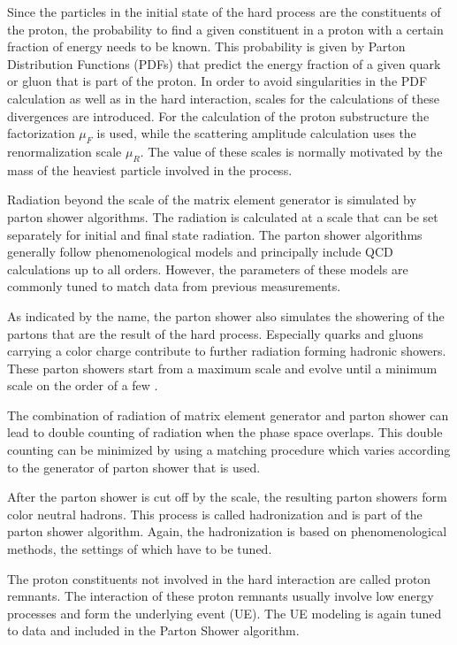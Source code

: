 Since the particles in the initial state of the hard process are the constituents of the proton, the probability to find a given constituent in a proton with a certain fraction of energy needs to be known.
This probability is given by Parton Distribution Functions (PDFs) that predict the energy fraction of a given quark or gluon that is part of the proton.
In order to avoid singularities in the PDF calculation as well as in the hard interaction, scales for the calculations of these divergences are introduced.
For the calculation of the proton substructure the factorization $\mu_F$ is used, while the scattering amplitude calculation uses the renormalization scale $\mu_R$.
The value of these scales is normally motivated by the mass of the heaviest particle involved in the process.

Radiation beyond the scale of the matrix element generator is simulated by parton shower algorithms.
The radiation is calculated at a scale that can be set separately for initial and final state radiation. 
The parton shower algorithms generally follow phenomenological models and principally include QCD calculations up to all orders.
However, the parameters of these models are commonly tuned to match data from previous measurements.

As indicated by the name, the parton shower also simulates the showering of the partons that are the result of the hard process.
Especially quarks and gluons carrying a color charge contribute to further radiation forming hadronic showers.
These parton showers start from a maximum scale and evolve until a minimum scale on the order of a few \GeV. 

The combination of radiation of matrix element generator and parton shower can lead to double counting of radiation when the phase space overlaps.
This double counting can be minimized by using a matching procedure which varies according to the generator of parton shower that is used.

After the parton shower is cut off by the scale, the resulting parton showers form color neutral hadrons.
This process is called hadronization and is part of the parton shower algorithm.
Again, the hadronization is based on phenomenological methods, the settings of which have to be tuned.

The proton constituents not involved in the hard interaction are called proton remnants. The interaction of these proton remnants usually involve low energy processes and form the underlying
event (UE). The UE modeling is again tuned to data and included in the Parton Shower algorithm.

